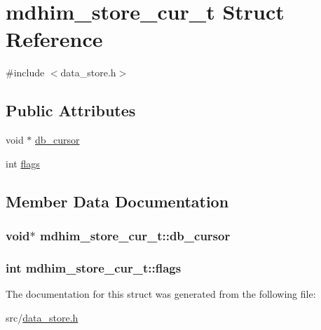 \hypertarget{structmdhim__store__cur__t}{\section{mdhim\-\_\-store\-\_\-cur\-\_\-t Struct Reference}
\label{d4/d50/structmdhim__store__cur__t}
}


{\ttfamily \#include $<$data\-\_\-store.\-h$>$}

\subsection*{Public Attributes}
\begin{DoxyCompactItemize}
\item 
void $\ast$ \hyperlink{structmdhim__store__cur__t_a27db7c8dc601c0036fd682b0a9cbb61b}{db\-\_\-cursor}
\item 
int \hyperlink{structmdhim__store__cur__t_a5b0574588a96ee463e91cacc8cd9a1b2}{flags}
\end{DoxyCompactItemize}


\subsection{Member Data Documentation}
\hypertarget{structmdhim__store__cur__t_a27db7c8dc601c0036fd682b0a9cbb61b}{
\subsubsection[{db\-\_\-cursor}]{\setlength{\rightskip}{0pt plus 5cm}void$\ast$ mdhim\-\_\-store\-\_\-cur\-\_\-t\-::db\-\_\-cursor}}\label{d4/d50/structmdhim__store__cur__t_a27db7c8dc601c0036fd682b0a9cbb61b}
\hypertarget{structmdhim__store__cur__t_a5b0574588a96ee463e91cacc8cd9a1b2}{
\subsubsection[{flags}]{\setlength{\rightskip}{0pt plus 5cm}int mdhim\-\_\-store\-\_\-cur\-\_\-t\-::flags}}\label{d4/d50/structmdhim__store__cur__t_a5b0574588a96ee463e91cacc8cd9a1b2}


The documentation for this struct was generated from the following file\-:\begin{DoxyCompactItemize}
\item 
src/\hyperlink{data__store_8h}{data\-\_\-store.\-h}\end{DoxyCompactItemize}
